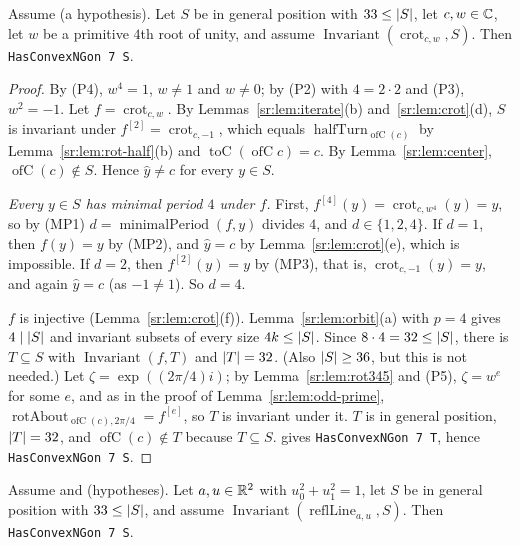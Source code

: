 \begin{lemma}\label{sr:lem:fourfold}
Assume  (a hypothesis). Let $S$ be in general position with $33\le\lvert S\rvert$, let $c,w\in\mathbb C$, let $w$ be
a primitive $4$th root of unity, and assume $\operatorname{Invariant}(\operatorname{crot}_{c,w},S)$. Then
\texttt{HasConvexNGon 7 S}.
\end{lemma}

\begin{proof}
By (P4), $w^4=1$, $w\ne1$ and $w\ne0$; by (P2) with $4=2\cdot2$ and (P3), $w^2=-1$. Let $f=\operatorname{crot}_{c,w}$.
By Lemmas~\ref{sr:lem:iterate}(b) and~\ref{sr:lem:crot}(d), $S$ is invariant under $f^{[2]}=\operatorname{crot}_{c,-1}$,
which equals $\operatorname{halfTurn}_{\operatorname{ofC}(c)}$ by Lemma~\ref{sr:lem:rot-half}(b) and
$\operatorname{toC}(\operatorname{ofC}c)=c$. By Lemma~\ref{sr:lem:center}, $\operatorname{ofC}(c)\notin S$. Hence $\hat
y\ne c$ for every $y\in S$.

\emph{Every $y\in S$ has minimal period $4$ under $f$.} First, $f^{[4]}(y)=\operatorname{crot}_{c,w^4}(y)=y$, so by (MP1)
$d=\operatorname{minimalPeriod}(f,y)$ divides $4$, and $d\in\{1,2,4\}$. If $d=1$, then $f(y)=y$ by (MP2), and $\hat y=c$
by Lemma~\ref{sr:lem:crot}(e), which is impossible. If $d=2$, then $f^{[2]}(y)=y$ by (MP3), that is,
$\operatorname{crot}_{c,-1}(y)=y$, and again $\hat y=c$ (as $-1\ne1$). So $d=4$.

$f$ is injective (Lemma~\ref{sr:lem:crot}(f)). Lemma~\ref{sr:lem:orbit}(a) with $p=4$ gives $4\mid\lvert S\rvert$ and invariant
subsets of every size $4k\le\lvert S\rvert$. Since $8\cdot4=32\le\lvert S\rvert$, there is $T\subseteq S$ with
$\operatorname{Invariant}(f,T)$ and $\lvert T\rvert=32$. (Also $\lvert S\rvert\ge36$, but this is not needed.) Let
$\zeta=\exp((2\pi/4)i)$; by Lemma~\ref{sr:lem:rot345} and (P5), $\zeta=w^e$ for some $e$, and as in the proof of
Lemma~\ref{sr:lem:odd-prime}, $\operatorname{rotAbout}_{\operatorname{ofC}(c),2\pi/4}=f^{[e]}$, so $T$ is invariant under
it. $T$ is in general position, $\lvert T\rvert=32$, and $\operatorname{ofC}(c)\notin T$ because $T\subseteq S$.
 gives \texttt{HasConvexNGon 7 T}, hence \texttt{HasConvexNGon 7 S}.
\end{proof}

\begin{lemma}\label{sr:lem:mirror}
Assume  and  (hypotheses). Let $a,u\in\mathbb R^2$ with $u_0^2+u_1^2=1$, let $S$ be in
general position with $33\le\lvert S\rvert$, and assume $\operatorname{Invariant}(\operatorname{reflLine}_{a,u},S)$. Then
\texttt{HasConvexNGon 7 S}.
\end{lemma}

